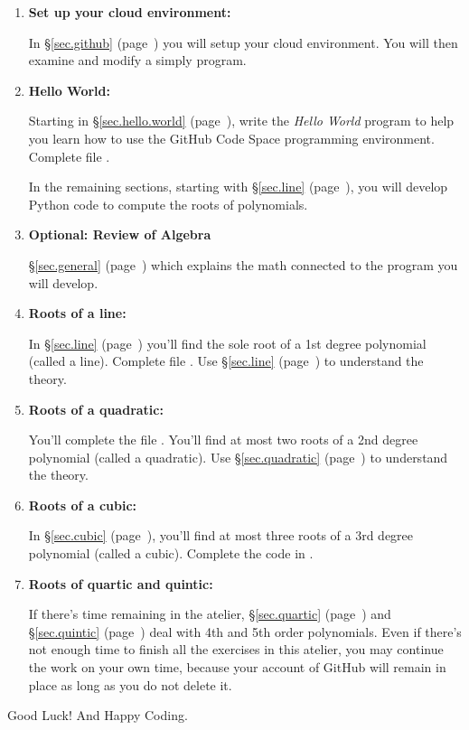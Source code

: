\begin{enumerate}  

\item \textbf{Set up your cloud environment:}

  In \S\ref{sec.github} (page~\pageref{sec.github}) you will setup your cloud environment. You
  will then examine and modify a simply  program.

\item \textbf{Hello World:}

  Starting in \S\ref{sec.hello.world} (page~\pageref{sec.hello.world}), write the
  \emph{Hello World} program to help you learn how to use the GitHub
  Code Space programming environment.  Complete file .

In the remaining sections, starting with \S\ref{sec.line} (page~\pageref{sec.line}), you
will develop Python code to compute the roots of polynomials.  


\item \textbf{Optional: Review of Algebra}

  \S\ref{sec.general} (page~\pageref{sec.general}) which explains the math
  connected to the program you will develop.


\item \textbf{Roots of a line:}

  In \S\ref{sec.line} (page~\pageref{sec.line}) you'll find the sole root of a 1st
  degree polynomial (called a line).  Complete file .
  Use \S\ref{sec.line} (page~\pageref{sec.line}) to understand the theory.

\item \textbf{Roots of a quadratic:}

  You'll complete the file
  .  You'll find at most two roots of a 2nd degree
  polynomial (called a quadratic).  Use \S\ref{sec.quadratic} (page~\pageref{sec.quadratic}) to
  understand the theory.

\item \textbf{Roots of a cubic:}

  In \S\ref{sec.cubic} (page~\pageref{sec.cubic}), you'll find at most
  three roots of a 3rd degree polynomial (called a cubic).  Complete
  the code in .

\item \textbf{Roots of quartic and quintic:}

  If there's time remaining in the
  atelier, \S\ref{sec.quartic} (page~\pageref{sec.quartic}) and \S\ref{sec.quintic} (page~\pageref{sec.quintic}) deal with
  4th and 5th order polynomials.  Even if there's not enough time to
  finish all the exercises in this atelier, you may continue the work
  on your own time, because your account of GitHub will remain in
  place as long as you do not delete it.
  
\end{enumerate}


Good Luck! And Happy Coding.


